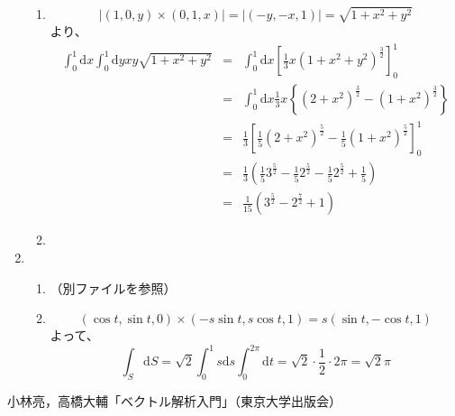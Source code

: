 \documentclass{jarticle}
\def\d{\mathrm d}
\begin{document}
\begin{enumerate}
\begin{enumerate}
      \item
        \[ | (1,0,y) \times (0,1,x) | = | (-y,-x,1) | = \sqrt{1+x^2+y^2} \]
        より、
        \begin{eqnarray*} 
          \int_0^1 \d x \int_0^1 \d y xy \sqrt{1+x^2+y^2} & = & \int_0^1 \d x \left[ \frac{1}{3} x (1+x^2+y^2)^\frac{3}{2} \right]_0^1 \\
          & = & \int_0^1 \d x \frac{1}{3} x \left\{ (2+x^2)^{\frac{3}{2}} - (1+x^2)^{\frac{3}{2}} \right\} \\
          & = & \frac{1}{3} \left[ \frac{1}{5} (2+x^2)^\frac{5}{2} - \frac{1}{5} (1+x^2)^\frac{5}{2} \right]_0^1 \\
          & = & \frac{1}{3} \left( \frac{1}{5} 3^\frac{5}{2} - \frac{1}{5} 2^\frac{5}{2} - \frac{1}{5} 2^\frac{5}{2} + \frac{1}{5} \right) \\
          & = & \frac{1}{15} \left( 3^\frac{5}{2} - 2^\frac{7}{2} + 1 \right)
        \end{eqnarray*}
      \item
    \end{enumerate}
  \item
    \begin{enumerate}
      \item
        （別ファイルを参照）
      \item
        \[ (\cos t,\sin t,0) \times (-s\sin t,s\cos t,1) = s(\sin t,-\cos t, 1) \]
        よって、
        \[ \int_S \d S = \sqrt{2} \int_0^1 s \d s \int_0^{2\pi} \d t = \sqrt{2} \cdot \frac{1}{2} \cdot 2\pi = \sqrt{2} \pi\]
    \end{enumerate}
\end{enumerate}
  \newpage
\begin{thebibliography}{99}
 小林亮，高橋大輔「ベクトル解析入門」（東京大学出版会）

\end{thebibliography}
\end{document}
